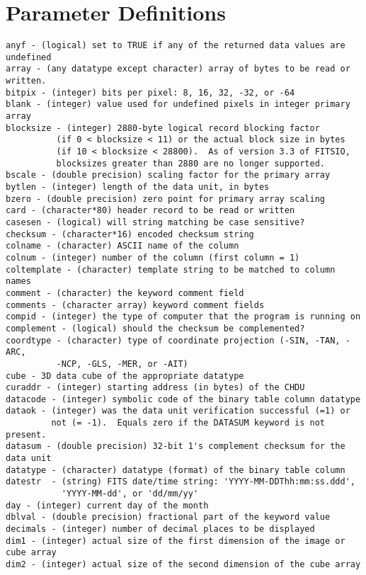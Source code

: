 \documentclass[11pt]{book}
\begin{document}
\chapter{ Parameter Definitions }

\begin{verbatim}
anyf - (logical) set to TRUE if any of the returned data values are undefined
array - (any datatype except character) array of bytes to be read or written.
bitpix - (integer) bits per pixel: 8, 16, 32, -32, or -64
blank - (integer) value used for undefined pixels in integer primary array
blocksize - (integer) 2880-byte logical record blocking factor
          (if 0 < blocksize < 11) or the actual block size in bytes
          (if 10 < blocksize < 28800).  As of version 3.3 of FITSIO,
          blocksizes greater than 2880 are no longer supported.
bscale - (double precision) scaling factor for the primary array
bytlen - (integer) length of the data unit, in bytes
bzero - (double precision) zero point for primary array scaling
card - (character*80) header record to be read or written
casesen - (logical) will string matching be case sensitive?
checksum - (character*16) encoded checksum string
colname - (character) ASCII name of the column
colnum - (integer) number of the column (first column = 1)
coltemplate - (character) template string to be matched to column names
comment - (character) the keyword comment field
comments - (character array) keyword comment fields
compid - (integer) the type of computer that the program is running on
complement - (logical) should the checksum be complemented?
coordtype - (character) type of coordinate projection (-SIN, -TAN, -ARC,
          -NCP, -GLS, -MER, or -AIT)
cube - 3D data cube of the appropriate datatype
curaddr - (integer) starting address (in bytes) of the CHDU
datacode - (integer) symbolic code of the binary table column datatype
dataok - (integer) was the data unit verification successful (=1) or
         not (= -1).  Equals zero if the DATASUM keyword is not present.
datasum - (double precision) 32-bit 1's complement checksum for the data unit
datatype - (character) datatype (format) of the binary table column
datestr  - (string) FITS date/time string: 'YYYY-MM-DDThh:mm:ss.ddd',
           'YYYY-MM-dd', or 'dd/mm/yy'
day - (integer) current day of the month
dblval - (double precision) fractional part of the keyword value
decimals - (integer) number of decimal places to be displayed
dim1 - (integer) actual size of the first dimension of the image or cube array
dim2 - (integer) actual size of the second dimension of the cube array

\end{verbatim}
\end{document}
